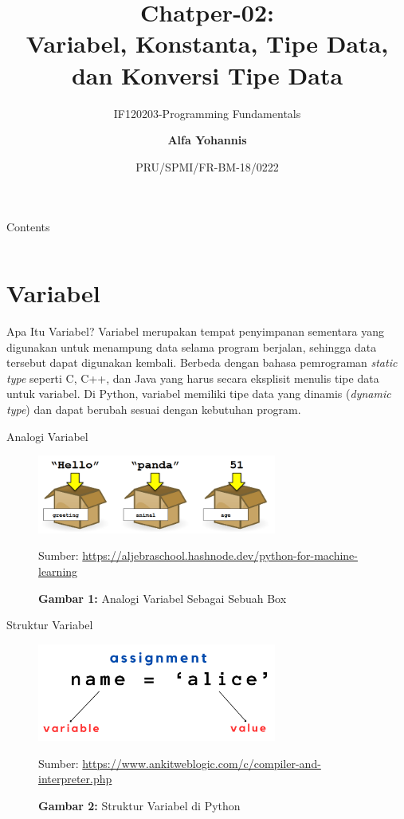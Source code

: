 \documentclass[aspectratio=169, table]{beamer}
\subtitle{IF120203-Programming Fundamentals}
\title{Chatper-02:\\\LARGE{Variabel, Konstanta, Tipe Data,\\ dan Konversi Tipe Data}}
\date[Serial]{\scriptsize {PRU/SPMI/FR-BM-18/0222}}
\author[Pradita]{\small{\textbf{Alfa Yohannis}}}
\begin{document}
\frame{\titlepage}

\begin{frame}[fragile]{Contents}
\vspace{15pt}
\begin{columns}[t]
\begin{column}{.5\textwidth}
\tableofcontents[sections={1-3}]
\end{column}
\begin{column}{.5\textwidth}
\tableofcontents[sections={4}]
\end{column}
\end{columns}
\end{frame}

\section{Variabel}
\begin{frame}{Apa Itu Variabel?}
Variabel merupakan tempat penyimpanan sementara yang digunakan untuk menampung data selama program berjalan, sehingga data tersebut dapat digunakan kembali. Berbeda dengan bahasa pemrograman \textit{static type} seperti C, C++, dan Java yang harus secara eksplisit menulis tipe data untuk variabel. Di Python, variabel memiliki tipe data yang dinamis (\textit{dynamic type}) dan dapat berubah sesuai dengan kebutuhan program.
\end{frame}

\begin{frame}{Analogi Variabel}
\begin{figure}[H]
	\centering
	\includegraphics[width=0.7\textwidth]{assets/images/variable_analogy.png}
	\caption*{\textbf{Gambar 1:} Analogi Variabel Sebagai Sebuah Box}
	\smallskip
    {\tiny Sumber: \url{https://aljebraschool.hashnode.dev/python-for-machine-learning}}
\end{figure}
\end{frame}

\begin{frame}{Struktur Variabel}
\begin{figure}[H]
	\centering
	\includegraphics[width=0.7\textwidth]{../../../shared_assets/images/python_variable_structure.png}
	\caption{}
	\caption*{\textbf{Gambar 2:} Struktur Variabel di Python}
	\smallskip
    {\tiny Sumber: \url{https://www.ankitweblogic.com/c/compiler-and-interpreter.php}}
\end{figure}
\end{frame}
\end{document}
